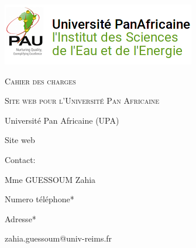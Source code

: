 \documentclass[oneside]{book}
\author{Nathan JANCZEWSKI, Léo BERGEROT, Loic HUSSON, Youness LOUCIF,\\ Alexandre QUILLET, Jonathan PAUGOIS }
\begin{document}
	\begin{titlepage}
		\centering		
		\includegraphics[scale=2]{logo}
		\vspace{5cm}
		{\par\scshape\Huge Cahier des charges \par}
		\vspace{0.5cm}
		{\par\scshape\Large Site web pour l'Université Pan Africaine\par}
		\vspace{10cm}
		{\par Université Pan Africaine (UPA)\par}
		{\par Site web \par}
		\vspace{1cm}
		{\par Contact: \par}
		{\par\small Mme GUESSOUM Zahia\par}
		{\par *Numero téléphone* \par}
		{\par *Adresse* \par}
		{\par zahia.guessoum@univ-reims.fr \par}
	\end{titlepage}		
	\tableofcontents
\end{document}
